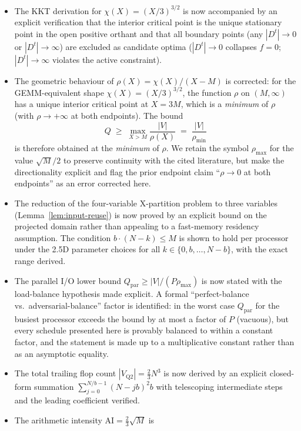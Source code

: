 \documentclass[11pt]{article}
\begin{document}
\begin{itemize}[leftmargin=2em]
\item The KKT derivation for $\chi(X) = (X/3)^{3/2}$ is now accompanied
  by an explicit verification that the interior critical point is the
  unique stationary point in the open positive orthant and that all
  boundary points (any $|D^t| \to 0$ or $|D^t| \to \infty$) are
  excluded as candidate optima ($|D^t| \to 0$ collapses $f = 0$;
  $|D^t| \to \infty$ violates the active constraint).
\item The geometric behaviour of $\rho(X) = \chi(X)/(X-M)$ is corrected:
  for the GEMM-equivalent shape $\chi(X) = (X/3)^{3/2}$, the function
  $\rho$ on $(M,\infty)$ has a unique interior critical point at $X = 3M$,
  which is a \emph{minimum} of $\rho$ (with $\rho \to +\infty$ at both
  endpoints). The bound
  \[ Q \;\ge\; \max_{X>M} \frac{|V|}{\rho(X)} \;=\; \frac{|V|}{\rho_{\min}}\]
  is therefore obtained at the \emph{minimum} of $\rho$. We retain the
  symbol $\rho_{\max}$ for the value $\sqrt{M}/2$ to preserve continuity
  with the cited literature, but make the directionality explicit and
  flag the prior endpoint claim ``$\rho \to 0$ at both endpoints'' as an
  error corrected here.
\item The reduction of the four-variable X-partition problem to three
  variables (Lemma~\ref{lem:input-reuse}) is now proved by an explicit
  bound on the projected domain rather than appealing to a fast-memory
  residency assumption. The condition $b \cdot (N-k) \le M$ is shown to
  hold per processor under the 2.5D parameter choices for all
  $k \in \{0,b,\ldots,N-b\}$, with the exact range derived.
\item The parallel I/O lower bound $Q_{\mathrm{par}} \ge |V|/(P\rho_{\max})$
  is now stated with the load-balance hypothesis made explicit. A
  formal ``perfect-balance vs.\ adversarial-balance'' factor is identified:
  in the worst case $Q_{\mathrm{par}}$ for the busiest processor exceeds
  the bound by at most a factor of $P$ (vacuous), but every schedule
  presented here is provably balanced to within a constant factor, and
  the statement is made up to a multiplicative constant rather than as
  an asymptotic equality.
\item The total trailing flop count $|V_{\mathrm{Q2}}| = \frac{2}{3}N^3$
  is now derived by an explicit closed-form summation
  $\sum_{j=0}^{N/b-1}(N-jb)^2 b$ with telescoping intermediate steps and
  the leading coefficient verified.
\item The arithmetic intensity $\mathrm{AI} = \frac{2}{3}\sqrt{M}$ is

\end{itemize}
\end{document}
